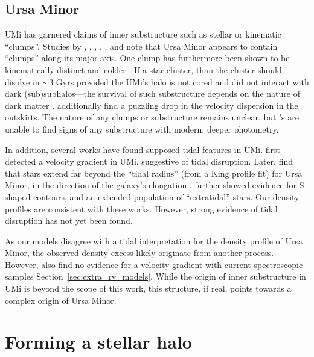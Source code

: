 \subsection{Ursa Minor}\label{ursa-minor}

UMi has garnered claims of inner substructure such as stellar or
kinematic ``clumps''. Studies by \citet{olszewski+aaronson1985},
\citet{demers+1995}, \citet{IH1995}, \citet{kleyna+1998},
\citet{battinelli+demers1999}, and \citet{bellazzini+2002} note that
Ursa Minor appears to contain ``clumps'' along its major axis. One clump
has furthermore been shown to be kinematically distinct and colder
\citep[e.g.,][]{pace+2014}. If a star cluster, than the cluster should
disolve in \(\sim 3\) Gyrs provided the UMi's halo is not cored and did
not interact with dark (sub)subhalos---the survival of such substructure
depends on the nature of dark matter \citep{kleyna+2003, lora+2012}.
\citet{wilkinson+2004} additionally find a puzzling drop in the velocity
dispersion in the outskirts. The nature of any clumps or substructure
remains unclear, but \citet{munoz+2018}'s are unable to find signs of
any substructure with modern, deeper photometry.

In addition, several works have found supposed tidal features in UMi.
\citet{hargreaves+1994} first detected a velocity gradient in UMi,
suggestive of tidal disruption. Later, \citet{martinez-delgado+2001}
find that stars extend far beyond the ``tidal radius'' (from a King
profile fit) for Ursa Minor, in the direction of the galaxy's elongation
\citep[see corresponding simulations
by][]{gomez-flechoso+martinez-delgado2003}. \citet{palma+2003} further
showed evidence for S-shaped contours, and an extended population of
``extratidal'' stars. Our density profiles are consistent with these
works. However, strong evidence of tidal disruption has not yet been
found.

As our models disagree with a tidal interpretation for the density
profile of Ursa Minor, the observed density excess likely originate from
another process. However, also find no evidence for a velocity gradient
with current spectroscopic samples Section~\ref{sec:extra_rv_models}.
While the origin of inner substructure in UMi is beyond the scope of
this work, this structure, if real, points towards a complex origin of
Ursa Minor.

\section{Forming a stellar halo}\label{sec:stellar_halos}

